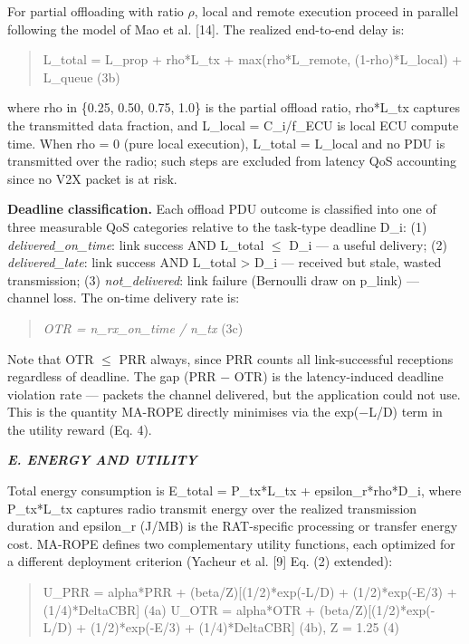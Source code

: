 \documentclass[journal,10pt,twocolumn]{IEEEtran}
\begin{document}
For partial offloading with ratio $\rho$, local and remote execution proceed
in parallel following the model of Mao et al. {[}14{]}. The realized
end-to-end delay is:

\begin{quote}
L\_total = L\_prop + rho*L\_tx + max(rho*L\_remote, (1-rho)*L\_local) +
L\_queue (3b)
\end{quote}

where rho in \{0.25, 0.50, 0.75, 1.0\} is the partial offload ratio,
rho*L\_tx captures the transmitted data fraction, and L\_local =
C\_i/f\_ECU is local ECU compute time. When rho = 0 (pure local
execution), L\_total = L\_local and no PDU is transmitted over the
radio; such steps are excluded from latency QoS accounting since no V2X
packet is at risk.

\textbf{Deadline classification.} Each offload PDU outcome is classified
into one of three measurable QoS categories relative to the task-type
deadline D\_i: (1) \emph{delivered\_on\_time}: link success AND L\_total
$\leq$ D\_i --- a useful delivery; (2) \emph{delivered\_late}: link success
AND L\_total \textgreater{} D\_i --- received but stale, wasted
transmission; (3) \emph{not\_delivered}: link failure (Bernoulli draw on
p\_link) --- channel loss. The on-time delivery rate is:

\begin{quote}
\emph{OTR = n\_rx\_on\_time / n\_tx} (3c)
\end{quote}

Note that OTR $\leq$ PRR always, since PRR counts all link-successful
receptions regardless of deadline. The gap (PRR − OTR) is the
latency-induced deadline violation rate --- packets the channel
delivered, but the application could not use. This is the quantity
MA-ROPE directly minimises via the exp(−L/D) term in the utility reward
(Eq. 4).

\emph{\textbf{E. ENERGY AND UTILITY}}

Total energy consumption is E\_total = P\_tx*L\_tx +
epsilon\_r*rho*D\_i, where P\_tx*L\_tx captures radio transmit energy
over the realized transmission duration and epsilon\_r (J/MB) is the
RAT-specific processing or transfer energy cost. MA-ROPE defines two
complementary utility functions, each optimized for a different
deployment criterion (Yacheur et al. {[}9{]} Eq. (2) extended):

\begin{quote}
U\_PRR = alpha*PRR + (beta/Z){[}(1/2)*exp(-L/D) + (1/2)*exp(-E/3) +
(1/4)*DeltaCBR{]} (4a) U\_OTR = alpha*OTR + (beta/Z){[}(1/2)*exp(-L/D) +
(1/2)*exp(-E/3) + (1/4)*DeltaCBR{]} (4b), Z = 1.25 (4)
\end{quote}
\end{document}
